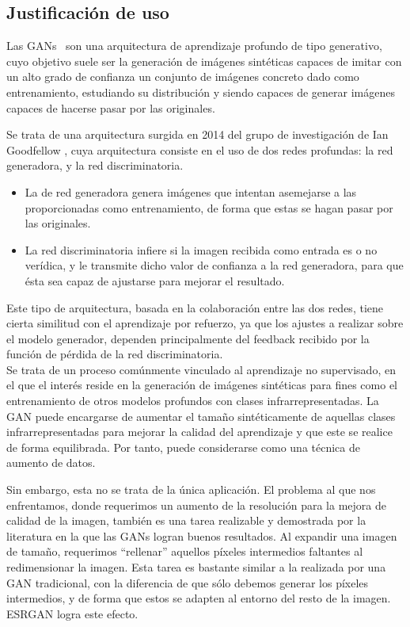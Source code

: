 \subsection{Justificación de uso}

Las GANs~\cite{goodfellow2014generative} son una arquitectura de aprendizaje profundo de tipo generativo, cuyo objetivo suele ser la generación de imágenes sintéticas capaces de imitar con un alto grado de confianza un conjunto de imágenes concreto dado como entrenamiento, estudiando su distribución y siendo capaces de generar imágenes capaces de hacerse pasar por las originales.

Se trata de una arquitectura surgida en 2014 del grupo de investigación de Ian Goodfellow \cite{goodfellow2014generative}, cuya arquitectura consiste en el uso de dos redes profundas: la red generadora, y la red discriminatoria.

 \begin{itemize}
 	\item La de red generadora genera imágenes que intentan asemejarse a las proporcionadas como entrenamiento, de forma que estas se hagan pasar por las originales.
 	\item La red discriminatoria infiere si la imagen recibida como entrada es o no verídica, y le transmite dicho valor de confianza a la red generadora, para que ésta sea capaz de ajustarse para mejorar el resultado.
 	\end{itemize}
 	
 Este tipo de arquitectura, basada en la colaboración entre las dos redes, tiene cierta similitud con el aprendizaje por refuerzo, ya que los ajustes a realizar sobre el modelo generador, dependen principalmente del feedback recibido por la función de pérdida de la red discriminatoria.\\
 
 Se trata de un proceso comúnmente vinculado al aprendizaje no supervisado, en el que el interés reside en la generación de imágenes sintéticas para fines como el entrenamiento de otros modelos profundos con clases infrarrepresentadas. La GAN puede encargarse de aumentar el tamaño sintéticamente de aquellas clases infrarrepresentadas para mejorar la calidad del aprendizaje y que este se realice de forma equilibrada. Por tanto, puede considerarse como una técnica de aumento de datos.

Sin embargo, esta no se trata de la única aplicación. El problema al que nos enfrentamos, donde requerimos un aumento de la resolución para la mejora de calidad de la imagen, también es una tarea realizable y demostrada por la literatura en la que las GANs logran buenos resultados. Al expandir una imagen de tamaño, requerimos ``rellenar'' aquellos píxeles intermedios faltantes al redimensionar la imagen. Esta tarea es bastante similar a la realizada por una GAN tradicional, con la diferencia de que sólo debemos generar los píxeles intermedios, y de forma que estos se adapten al entorno del resto de la imagen.  ESRGAN\cite{wang2018esrgan} logra este efecto.\\

